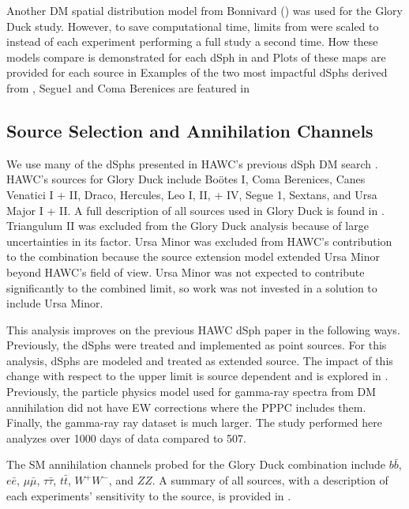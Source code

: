 Another DM spatial distribution model from Bonnivard (\B) \cite{Bonnivard:2014kza} was used for the Glory Duck study.
However, to save computational time, limits from \GS were scaled to \B instead of each experiment performing a full study a second time.
How these models compare is demonstrated for each dSph in  and 
Plots of these maps are provided for each source in 
Examples of the two most impactful dSphs derived from \GS, Segue1 and Coma Berenices are featured in 

\subsection{Source Selection and Annihilation Channels}\label{sec:gd_srcs_y_chan}

We use many of the dSphs presented in HAWC's previous dSph DM search \cite{Albert_2018}.
HAWC's sources for Glory Duck include Boötes I, Coma Berenices, Canes Venatici I + II, Draco, Hercules, Leo I, II, + IV, Segue 1, Sextans, and Ursa Major I + II.
A full description of all sources used in Glory Duck is found in .
Triangulum II was excluded from the Glory Duck analysis because of large uncertainties in its \J factor.
Ursa Minor was excluded from HAWC's contribution to the combination because the source extension model extended Ursa Minor beyond HAWC's field of view.
Ursa Minor was not expected to contribute significantly to the combined limit, so work was not invested in a solution to include Ursa Minor.

This analysis improves on the previous HAWC dSph paper \cite{Albert_2018} in the following ways.
Previously, the dSphs were treated and implemented as point sources.
For this analysis, dSphs are modeled and treated as extended source.
The impact of this change with respect to the upper limit is source dependent and is explored in .
Previously, the particle physics model used for gamma-ray spectra from DM annihilation did not have EW corrections where the PPPC includes them.
Finally, the gamma-ray ray dataset is much larger.
The study performed here analyzes over 1000 days of data compared to 507.

The SM annihilation channels probed for the Glory Duck combination include $b\bar{b}$, $e\bar{e}$, $\mu\bar{\mu}$, $\tau\bar{\tau}$, $t\bar{t}$, $W^+W^-$, and $ZZ$.
A summary of all sources, with a description of each experiments' sensitivity to the source, is provided in .

